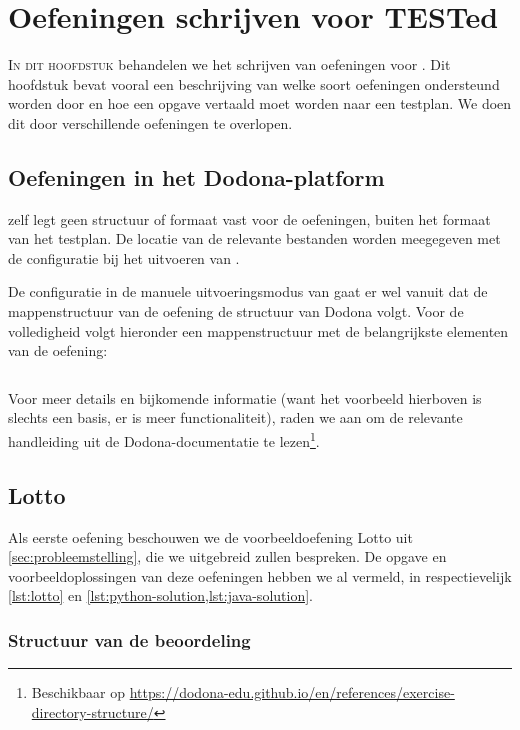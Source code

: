 \chapter{Oefeningen schrijven voor TESTed}\label{ch:nieuwe-oefening}

\lettrine{I}{n dit hoofdstuk} behandelen we het schrijven van oefeningen voor \tested{}.
Dit hoofdstuk bevat vooral een beschrijving van welke soort oefeningen ondersteund worden door \tested{} en hoe een opgave vertaald moet worden naar een testplan.
We doen dit door verschillende oefeningen te overlopen.

\section{Oefeningen in het Dodona-platform}\label{sec:oefeningen-in-het-dodona-platform}

\tested{} zelf legt geen structuur of formaat vast voor de oefeningen, buiten het formaat van het testplan.
De locatie van de relevante bestanden worden meegegeven met de configuratie bij het uitvoeren van \tested{}.

De configuratie in de manuele uitvoeringsmodus van \tested{} gaat er wel vanuit dat de mappenstructuur van de oefening de structuur van Dodona volgt.
Voor de volledigheid volgt hieronder een mappenstructuur met de belangrijkste elementen van de oefening:

\inputminted{text}{code/dirs-exercise.txt}

Voor meer details en bijkomende informatie (want het voorbeeld hierboven is slechts een basis, er is meer functionaliteit), raden we aan om de relevante handleiding uit de Dodona-documentatie te lezen\footnote{Beschikbaar op \url{https://dodona-edu.github.io/en/references/exercise-directory-structure/}}.

\section{Lotto}\label{sec:oefening-lotto}

Als eerste oefening beschouwen we de voorbeeldoefening Lotto uit \cref{sec:probleemstelling}, die we uitgebreid zullen bespreken.
De opgave en voorbeeldoplossingen van deze oefeningen hebben we al vermeld, in respectievelijk \cref{lst:lotto} en \cref{lst:python-solution,lst:java-solution}.

\subsection{Structuur van de beoordeling}\label{subsec:oefening-lotto-structuur}

